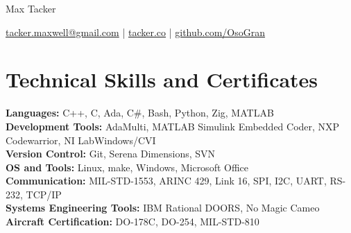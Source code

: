 \documentclass[11pt]{article}       %
\begin{document}
\centerline{\Huge Max Tacker}

\vspace{5pt}

\centerline{\href{mailto:tacker.maxwell@gmail.com}{tacker.maxwell@gmail.com} | \href{https://www.tacker.co/}{tacker.co} | \href{https://www.github.com/OsoGran}{github.com/OsoGran}}

\vspace{-10pt}

\section*{Technical Skills and Certificates}
\textbf{Languages:} C++, C, Ada, C\#, Bash, Python, Zig, MATLAB\\
\textbf{Development Tools:} AdaMulti, MATLAB Simulink Embedded Coder, NXP Codewarrior, NI LabWindows/CVI\\
\textbf{Version Control:} Git, Serena Dimensions, SVN\\
\textbf{OS and Tools:} Linux, make, Windows, Microsoft Office \\
\textbf{Communication:} MIL-STD-1553, ARINC 429, Link 16, SPI, I2C, UART, RS-232, TCP/IP\\
\textbf{Systems Engineering Tools:} IBM Rational DOORS, No Magic Cameo\\
\textbf{Aircraft Certification:} DO-178C, DO-254, MIL-STD-810\\

\vspace{-6.5pt}

\end{document}
